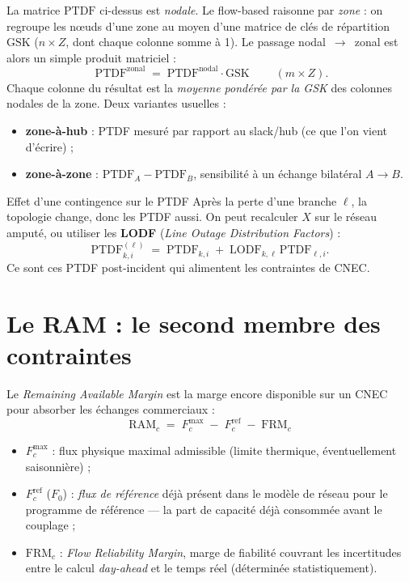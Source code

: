 \documentclass[11pt,a4paper]{article}
\newcommand{\RAM}{\mathrm{RAM}}
\newcommand{\Fmax}{F^{\max}}
\newcommand{\Fref}{F^{\mathrm{ref}}}
\newcommand{\FRM}{\mathrm{FRM}}
\begin{document}
La matrice $\mathrm{PTDF}$ ci-dessus est \emph{nodale}. Le flow-based
raisonne par \emph{zone} : on regroupe les n\oe{}uds d'une zone au moyen
d'une matrice de clés de répartition $\mathrm{GSK}$ ($n\times Z$, dont
chaque colonne somme à 1). Le passage nodal~$\to$~zonal est alors un simple
produit matriciel :
\[
  \boxed{\;\mathrm{PTDF}^{\text{zonal}} \;=\; \mathrm{PTDF}^{\text{nodal}}\cdot \mathrm{GSK}\;}\qquad (m\times Z).
\]
Chaque colonne du résultat est la \emph{moyenne pondérée par la GSK} des
colonnes nodales de la zone. Deux variantes usuelles :
\begin{itemize}[nosep,leftmargin=1.4em]
  \item \textbf{zone-à-hub} : PTDF mesuré par rapport au slack/hub
        (ce que l'on vient d'écrire) ;
  \item \textbf{zone-à-zone} : $\mathrm{PTDF}_A - \mathrm{PTDF}_B$,
        sensibilité à un échange bilatéral $A\!\to\!B$.
\end{itemize}

\begin{rembox}{Effet d'une contingence sur le PTDF}
Après la perte d'une branche $\ell$, la topologie change, donc les PTDF
aussi. On peut recalculer $X$ sur le réseau amputé, ou utiliser les
\textbf{LODF} (\emph{Line Outage Distribution Factors}) :
\[
  \mathrm{PTDF}^{(\ell)}_{k,i} \;=\; \mathrm{PTDF}_{k,i}
     \;+\; \mathrm{LODF}_{k,\ell}\,\mathrm{PTDF}_{\ell,i}.
\]
Ce sont ces PTDF post-incident qui alimentent les contraintes de CNEC.
\end{rembox}

\section{Le RAM : le second membre des contraintes}

Le \emph{Remaining Available Margin} est la marge encore disponible sur un
CNEC pour absorber les échanges commerciaux :
\[
  \boxed{\;\RAM_c \;=\; \Fmax_c \;-\; \Fref_c \;-\; \FRM_c\;}
\]
\begin{itemize}[nosep,leftmargin=1.4em]
  \item $\Fmax_c$ : flux physique maximal admissible (limite thermique,
        éventuellement saisonnière) ;
  \item $\Fref_c$ ($F_0$) : \emph{flux de référence} déjà présent dans le
        modèle de réseau pour le programme de référence — la part de
        capacité déjà consommée avant le couplage ;
  \item $\FRM_c$ : \emph{Flow Reliability Margin}, marge de fiabilité
        couvrant les incertitudes entre le calcul \emph{day-ahead} et le
        temps réel (déterminée statistiquement).
\end{itemize}
\end{document}
